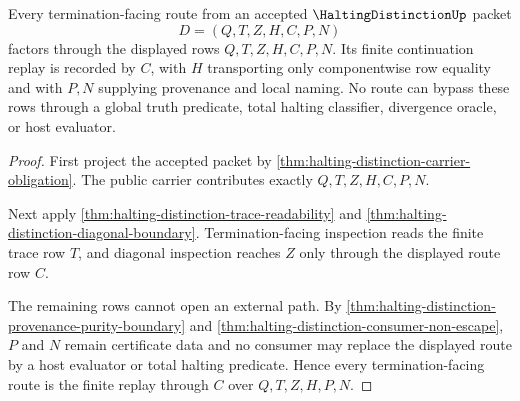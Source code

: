 \begin{theorem}
\label{thm:halting-distinction-route-stability}
Every termination-facing route from an accepted $\HaltingDistinctionUp$ packet
$$
D=(Q,T,Z,H,C,P,N)
$$
factors through the displayed rows $Q,T,Z,H,C,P,N$. Its finite continuation replay is recorded by $C$, with $H$ transporting only componentwise row equality and with $P,N$ supplying provenance and local naming. No route can bypass these rows through a global truth predicate, total halting classifier, divergence oracle, or host evaluator.
\end{theorem}
\begin{proof}
First project the accepted packet by \autoref{thm:halting-distinction-carrier-obligation}. The public carrier contributes exactly $Q,T,Z,H,C,P,N$.

Next apply \autoref{thm:halting-distinction-trace-readability} and \autoref{thm:halting-distinction-diagonal-boundary}. Termination-facing inspection reads the finite trace row $T$, and diagonal inspection reaches $Z$ only through the displayed route row $C$.

The remaining rows cannot open an external path. By \autoref{thm:halting-distinction-provenance-purity-boundary} and \autoref{thm:halting-distinction-consumer-non-escape}, $P$ and $N$ remain certificate data and no consumer may replace the displayed route by a host evaluator or total halting predicate. Hence every termination-facing route is the finite replay through $C$ over $Q,T,Z,H,P,N$.
\end{proof}

